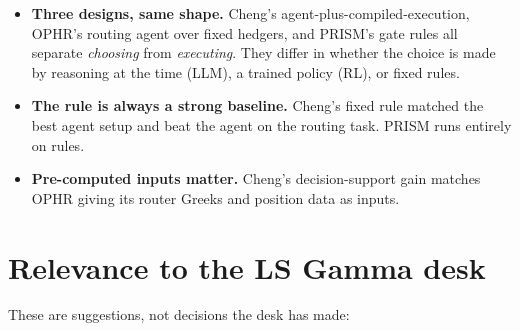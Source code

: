 \documentclass{article}
\begin{document}
\begin{itemize}

\item \textbf{Three designs, same shape.} Cheng's agent-plus-compiled-execution, OPHR's routing agent over fixed hedgers, and PRISM's gate rules all separate \emph{choosing} from \emph{executing}. They differ in whether the choice is made by reasoning at the time (LLM), a trained policy (RL), or fixed rules.

\item \textbf{The rule is always a strong baseline.} Cheng's fixed rule matched the best agent setup and beat the agent on the routing task. PRISM runs entirely on rules.

\item \textbf{Pre-computed inputs matter.} Cheng's decision-support gain matches OPHR giving its router Greeks and position data as inputs.

\end{itemize}

\section{Relevance to the LS Gamma desk}

These are suggestions, not decisions the desk has made:
\end{document}
